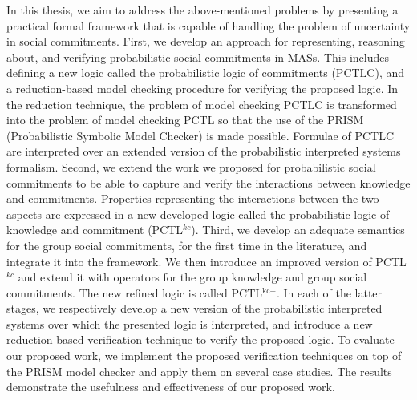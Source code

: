 In this thesis, we aim to address the above-mentioned problems by presenting a practical formal framework that is capable of handling the problem of uncertainty in social commitments. First, we develop an approach for representing, reasoning about, and verifying probabilistic social commitments in MASs. This includes defining a new logic called the probabilistic logic of commitments (PCTLC), and a reduction-based model checking procedure for verifying the proposed logic. In the reduction technique, the problem of model checking PCTLC is transformed into the problem of model checking PCTL so that the use of the PRISM (Probabilistic Symbolic Model Checker) is made possible. Formulae of PCTLC are interpreted over an extended version of the probabilistic interpreted systems formalism. Second, we extend the work we proposed for probabilistic social commitments to be able to capture and verify the interactions between knowledge and commitments. Properties representing the interactions between the two aspects are expressed in a new developed logic called the probabilistic logic of knowledge and commitment (PCTL$^{kc}$). Third, we develop an adequate semantics for the group social commitments, for the first time in the literature, and integrate it into the framework. We then introduce an improved version of PCTL$^{kc}$ and extend it with operators for the group knowledge and group social commitments. The new refined logic is called PCTL$^{\textrm{kc+}}$. In each of the latter stages, we respectively develop a new version of the probabilistic interpreted systems over which the presented logic is interpreted, and introduce a new reduction-based verification technique to verify the proposed logic. To evaluate our proposed work, we implement the proposed verification techniques on top of the PRISM model checker and apply them on several case studies. The results demonstrate the usefulness and effectiveness of our proposed work.
\\


